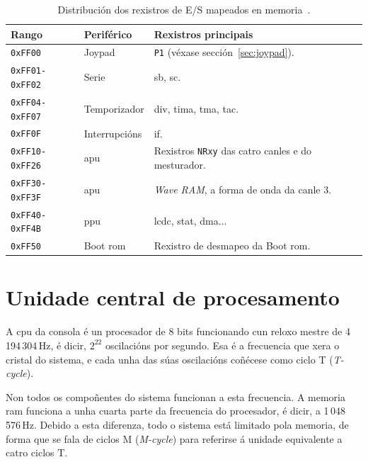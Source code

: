 \begin{table}[htbp]
  \centering
  \begin{tabular}{l|l|>{\raggedright\arraybackslash}p{5.2cm}}
  \rowcolor{udcpink!25}
  \textbf{Rango} & \textbf{Periférico} & \textbf{Rexistros principais} \\\hline
  \texttt{0xFF00}       & Joypad        & \texttt{P1} (véxase sección~\ref{sec:joypad}). \\
  \texttt{0xFF01-0xFF02} & Serie         & \acrshort{sb}, \acrshort{sc}. \\
  \texttt{0xFF04-0xFF07} & Temporizador  & \acrshort{div}, \acrshort{tima}, \acrshort{tma}, \acrshort{tac}. \\
  \texttt{0xFF0F}       & Interrupcións & \acrshort{if}. \\
  \texttt{0xFF10-0xFF26} & \acrshort{apu} & Rexistros \texttt{NRxy} das catro canles e do mesturador. \\
  \texttt{0xFF30-0xFF3F} & \acrshort{apu} & \textit{Wave RAM}, a forma de onda da canle 3. \\
  \texttt{0xFF40-0xFF4B} & \acrshort{ppu} & \acrshort{lcdc}, \acrshort{stat}, \acrshort{dma}... \\
  \texttt{0xFF50}       & Boot \acrshort{rom} & Rexistro de desmapeo da Boot \acrshort{rom}. \\
  \end{tabular}
  \caption{Distribución dos rexistros de E/S mapeados en memoria~\cite{pandocs}.}
  \label{tab:rexistros-io}
\end{table}



\section{Unidade central de procesamento}
\label{sec:cpu}

A \acrshort{cpu} da consola é un procesador de 8 bits funcionando cun reloxo mestre de
4\,194\,304\,Hz, é dicir, $2^{22}$ oscilacións por segundo. Esa é a frecuencia que xera o
cristal do sistema, e cada unha das súas oscilacións coñécese como ciclo T
(\textit{T-cycle}).

Non todos os compoñentes do sistema funcionan a esta frecuencia. A memoria \acrshort{ram} funciona
a unha cuarta parte da frecuencia do procesador, é dicir, a 1\,048\,576\,Hz.
Debido a esta diferenza, todo o sistema está limitado pola memoria, de forma que
se fala de ciclos M (\textit{M-cycle}) para referirse á unidade equivalente a catro ciclos T.

